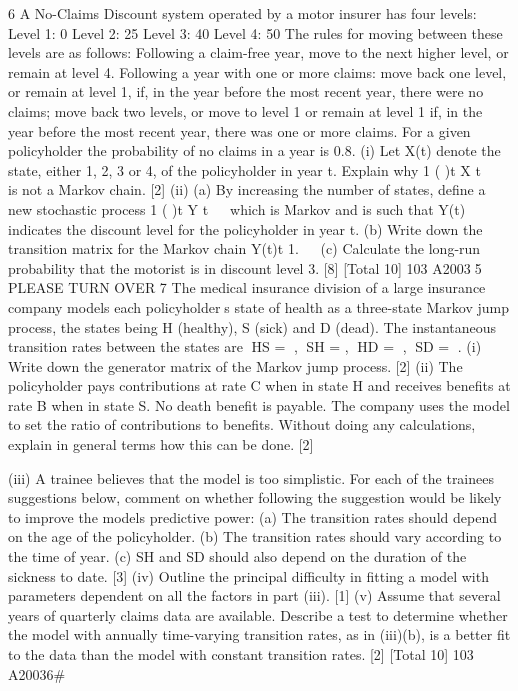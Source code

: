 \documentclass[a4paper,12pt]{article}
\begin{document}
\begin{enumerate}

6 A No-Claims Discount system operated by a motor insurer has four levels:
Level 1: 0%
Level 2: 25%
Level 3: 40%
Level 4: 50%
The rules for moving between these levels are as follows:
Following a claim-free year, move to the next higher level, or remain at
level 4.
Following a year with one or more claims:
move back one level, or remain at level 1, if, in the year before the
most recent year, there were no claims;
move back two levels, or move to level 1 or remain at level 1 if, in the
year before the most recent year, there was one or more claims.
For a given policyholder the probability of no claims in a year is 0.8.
(i) Let X(t) denote the state, either 1, 2, 3 or 4, of the policyholder in year t.
Explain why 1 { ( )}t X t 
 is not a Markov chain. [2]
(ii) (a) By increasing the number of states, define a new stochastic process
1 { ( )}t Y t 
 which is Markov and is such that Y(t) indicates the discount
level for the policyholder in year t.
(b) Write down the transition matrix for the Markov chain {Y(t)}t 1. 

(c) Calculate the long-run probability that the motorist is in discount
level 3.
[8]
[Total 10]
103 A20035 PLEASE TURN OVER
7 The medical insurance division of a large insurance company models each
policyholders state of health as a three-state Markov jump process, the states being
H (healthy), S (sick) and D (dead). The instantaneous transition rates between the
states are HS = , SH = 
, HD = , SD = .
(i) Write down the generator matrix of the Markov jump process. [2]
(ii) The policyholder pays contributions at rate C when in state H and receives benefits at rate B when in state S. No death benefit is payable. The company uses the model to set the ratio of contributions to benefits. Without doing any calculations, explain in general terms how this can be done. [2]

(iii) A trainee believes that the model is too simplistic. For each of the trainees
suggestions below, comment on whether following the suggestion would be likely to improve the models predictive power:
(a) The transition rates should depend on the age of the policyholder.
(b) The transition rates should vary according to the time of year.
(c) SH and SD should also depend on the duration of the sickness to date.
[3]
(iv) Outline the principal difficulty in fitting a model with parameters dependent on all the factors in part (iii). [1]
(v) Assume that several years of quarterly claims data are available. Describe a test to determine whether the model with annually time-varying transition rates, as in (iii)(b), is a better fit to the data than the model with constant
transition rates. [2]
[Total 10]
103 A20036#


\end{enumerate}
\end{document}
